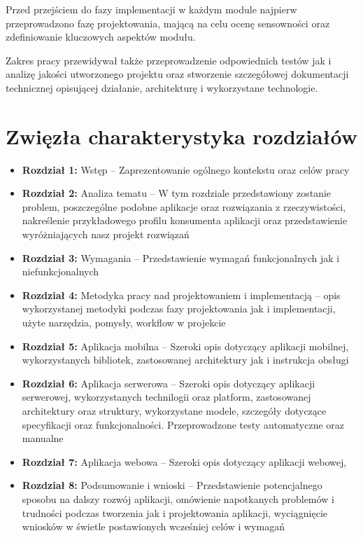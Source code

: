 \documentclass[a4paper,twoside,12pt]{book}
\begin{document}
Przed przejściem do fazy implementacji w każdym module najpierw przeprowadzono fazę projektowania, mającą na celu ocenę sensowności oraz zdefiniowanie kluczowych aspektów modułu. 

Zakres pracy przewidywał także przeprowadzenie odpowiednich testów jak i analizę jakości utworzonego projektu oraz stworzenie szczegółowej dokumentacji technicznej opisującej działanie, architekturę i wykorzystane technologie.

\newpage

\section{Zwięzła charakterystyka rozdziałów}
\begin{itemize}
    \item \textbf{Rozdział 1:} Wstęp -- Zaprezentowanie ogólnego kontekstu oraz celów pracy
    \item \textbf{Rozdział 2:} Analiza tematu -- W tym rozdziale przedstawiony zostanie problem, poszczególne podobne aplikacje oraz rozwiązania z rzeczywistości, nakreślenie przykładowego profilu konsumenta aplikacji oraz przedstawienie wyróżniających nasz projekt rozwiązań
    \item \textbf{Rozdział 3:} Wymagania -- Przedstawienie wymagań funkcjonalnych jak i niefunkcjonalnych
    \item \textbf{Rozdział 4:} Metodyka pracy nad projektowaniem i implementacją -- opis wykorzystanej metodyki podczas fazy projektowania jak i implementacji, użyte narzędzia, pomysły, workflow w projekcie
    \item \textbf{Rozdział 5:} Aplikacja mobilna -- Szeroki opis dotyczący aplikacji mobilnej, wykorzystanych bibliotek, zastosowanej architektury jak i instrukcja obsługi
    \item \textbf{Rozdział 6:} Aplikacja serwerowa -- Szeroki opis dotyczący aplikacji serwerowej, wykorzystanych technilogii oraz platform, zastosowanej architektury  oraz struktury, wykorzystane modele, szczegóły dotyczące specyfikacji oraz funkcjonalności. Przeprowadzone testy automatyczne oraz manualne
    \item \textbf{Rozdział 7:} Aplikacja webowa -- Szeroki opis dotyczący aplikacji webowej,
    \item \textbf{Rozdział 8:} Podsumowanie i wnioski -- Przedstawienie potencjalnego sposobu na dalszy rozwój aplikacji, omówienie napotkanych problemów i trudności podczas tworzenia jak i projektowania aplikacji, wyciągnięcie wniosków w świetle postawionych wcześniej celów i wymagań
\end{itemize}
\end{document}

